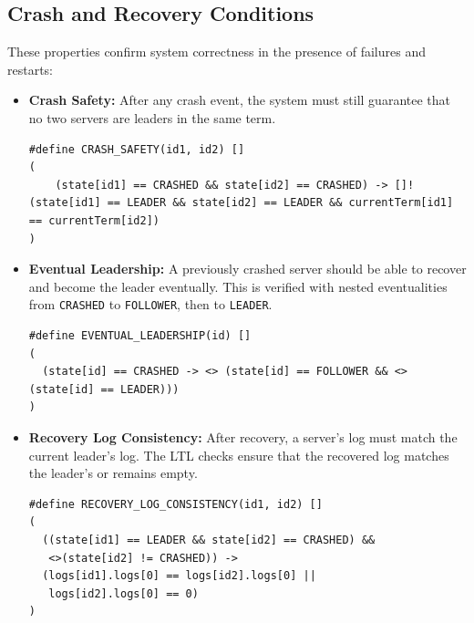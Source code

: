 \documentclass[a4paper]{llncs}
\begin{document}
\subsection{Crash and Recovery Conditions}

These properties confirm system correctness in the presence of failures and restarts:

\begin{itemize}
    \item \textbf{Crash Safety:} \label{prop:crash_safety} After any crash event, the system must still guarantee that no two servers are leaders in the same term.
    
    \begin{lstlisting}[style=promela, caption={LTL Formula for Crash Safety}, label={lst:ltl_crash_safety}]
#define CRASH_SAFETY(id1, id2) [] 
(
    (state[id1] == CRASHED && state[id2] == CRASHED) -> []!(state[id1] == LEADER && state[id2] == LEADER && currentTerm[id1] == currentTerm[id2])
)
    \end{lstlisting}
    
    \item \textbf{Eventual Leadership:} \label{prop:eventual_leadership} A previously crashed server should be able to recover and become the leader eventually. This is verified with nested eventualities from \texttt{CRASHED} to \texttt{FOLLOWER}, then to \texttt{LEADER}.
    
    \begin{lstlisting}[style=promela, caption={LTL Formula for Eventual Leadership}, label={lst:ltl_eventual_leadership}]
#define EVENTUAL_LEADERSHIP(id) []
(
  (state[id] == CRASHED -> <> (state[id] == FOLLOWER && <>(state[id] == LEADER)))
)
    \end{lstlisting}
    
    \item \textbf{Recovery Log Consistency:} \label{prop:recovery_log_consistency} After recovery, a server's log must match the current leader's log. The LTL checks ensure that the recovered log matches the leader's or remains empty.
    
    \begin{lstlisting}[style=promela, caption={LTL Formula for Recovery Log Consistency}, label={lst:ltl_recovery_log_consistency}]
#define RECOVERY_LOG_CONSISTENCY(id1, id2) []
(
  ((state[id1] == LEADER && state[id2] == CRASHED) &&
   <>(state[id2] != CRASHED)) ->
  (logs[id1].logs[0] == logs[id2].logs[0] ||
   logs[id2].logs[0] == 0)
)
    \end{lstlisting}
\end{itemize}
\end{document}

